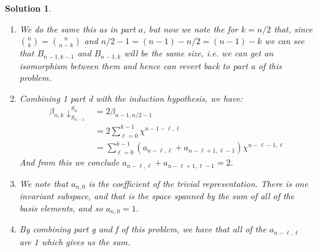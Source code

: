 \documentclass{article}
\theoremstyle{normal}
\theoremstyle{thmit}
\newtheorem*{solution}{Solution}
\begin{document}
\begin{solution}
\begin{enumerate}
            But from the sum, there are no parts of this form for when $k>\ell$, so we conclude the
            the coefficient must be zero. Now, to get the $\chi^{n-k-1,k}$ term we must have the
            $\ell=k$ term, and we must have only one of those. But then to get the rest of the sum, this
            also fixes what the rest of the coefficients must be, and that is 1 for $\ell<k$.
        \item
            We do the same this as in part $a$, but now we note the for $k=n/2$ that, since
            $\binom{n}{k}=\binom{n}{n-k}$ and $n/2-1=(n-1)-n/2=(n-1)-k$ we can see that
            $B_{n-1,k-1}$ and $B_{n-1,k}$ will be the same size, i.e. we can get an isomorphism between
            them and hence can revert back to part a of this problem.
        \item
            Combining 1 part d with the induction hypothesis, we have:
            \begin{subequations}
                \begin{align}
                    \beta_{n,k}\downarrow_{S_{n-1}}^{S_{n}}
                            &=2\beta_{n-1,n/2-1}\\
                            &=2\sum_{\ell=0}^{k-1}\chi^{n-1-\ell,\ell}\\
                            &=\sum_{\ell=0}^{k-1}(a_{n-\ell,\ell}+a_{n-\ell+1,\ell-1})\chi^{n-\ell-1,\ell}
                \end{align}
            \end{subequations}
            And from this we conclude $a_{n-\ell,\ell}+a_{n-\ell+1,\ell-1}=2$.
        \item
            We note that $a_{n,0}$ is the coefficient of the trivial representation. There is one
            invariant subspace, and that is the space spanned by the sum of all of the basis elements,
            and so $a_{n,0}=1$.
        \item
            By combining part g and f of this problem, we have that all of the $a_{n-\ell,\ell}$ are
            1 which gives us the sum.
    \end{enumerate}
\end{solution}
\end{document}
